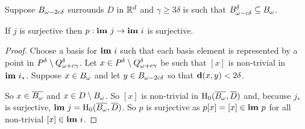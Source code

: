 \begin{lemma}\label{lem:psurj}
  Suppose $B_{\omega - 2c{\delta}}$ surrounds $D$ in $\mathbb{R}^d$ and $\gamma\geq 3\delta$ is such that $B_{\omega - c{\delta}}^{\delta}\subseteq B_\omega$.

  If $j$ is surjective then $p : \mathbf{im}~j\to\mathbf{im}~i$ is surjective.
\end{lemma}
\begin{proof}
  Choose a basis for $\mathbf{im}~i$ such that each basis element is represented by a point in $P^{{\delta}}\setminus Q_{\omega + c{\gamma}}^{\delta}$.
  Let $x\in P^{{\delta}}\setminus Q_{\omega + c{\gamma}}^{\delta}$ be such that $[x]$ is non-trivial in $\mathbf{im}~i_*$.
  Suppose $x\in B_\omega$ and let $y\in B_{\omega - 2c{\delta}}$ so that $\mathbf{d}(x, y) < {2\delta}$.

  So $x\in\overline{B_\omega}$ and $x\in D\setminus B_\omega$.
  So $[x]$ is non-trivial in $\mathrm{H}_0(\overline{B_\omega},\overline{D})$ and, because $j_*$ is surjective, $\mathbf{im}~j = \mathrm{H}_0(\overline{B_\omega},\overline{D})$.
  So $p$ is surjective as $p[x] = [x]\in\mathbf{im}~p$ for all non-trivial $[x]\in\mathbf{im}~i$.
\end{proof}

